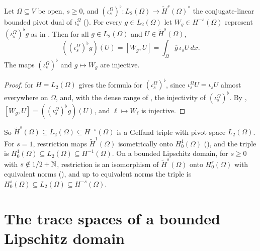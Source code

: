 \begin{theorem}
\label{thm:domain-gelfand-triple}
\leanok
{}
Let $\Omega \subseteq V$ be open, $s \geq 0$, and
$(\iota^\Omega_s)^\flat : L_2(\Omega) \to \tilde H^s(\Omega)^*$ the conjugate-linear bounded
pivot dual of $\iota^\Omega_s$ (). For every $g \in L_2(\Omega)$ let
$W_g \in H^{-s}(\Omega)$ represent $(\iota^\Omega_s)^\flat g$ as in .
Then for all $g \in L_2(\Omega)$ and $U \in \tilde H^s(\Omega)$,
\[
  ((\iota^\Omega_s)^\flat g)(U) = [W_g, U] = \int_\Omega \overline{g} \, \iota_s U \, dx .
\]
The maps $(\iota^\Omega_s)^\flat$ and $g \mapsto W_g$ are injective.
\end{theorem}

\begin{proof}
\leanok
{} for $H = L_2(\Omega)$ gives the formula for $(\iota^\Omega_s)^\flat$, since
$\iota^\Omega_s U = \iota_s U$ almost everywhere on $\Omega$, and, with the dense range of
, the injectivity of $(\iota^\Omega_s)^\flat$. By
, $[W_g, U] = ((\iota^\Omega_s)^\flat g)(U)$, and
$\ell \mapsto W_\ell$ is injective.
\end{proof}

So $\tilde H^s(\Omega) \subseteq L_2(\Omega) \subseteq H^{-s}(\Omega)$ is a Gelfand triple with
pivot space $L_2(\Omega)$.
For $s = 1$, restriction maps $\tilde H^1(\Omega)$ isometrically onto $H^1_0(\Omega)$
(), and the triple is
$H^1_0(\Omega) \subseteq L_2(\Omega) \subseteq H^{-1}(\Omega)$. On a bounded Lipschitz domain,
for $s \geq 0$ with $s \notin 1/2 + \mathbb{N}$, restriction is an isomorphism of $\tilde H^s(\Omega)$
onto $H^s_0(\Omega)$ with equivalent norms \cite[Theorem 3.33]{McLean}
(), and up to equivalent norms the triple is
$H^s_0(\Omega) \subseteq L_2(\Omega) \subseteq H^{-s}(\Omega)$.

\section{The trace spaces of a bounded Lipschitz domain}
\label{sec:boundary-trace-space}

